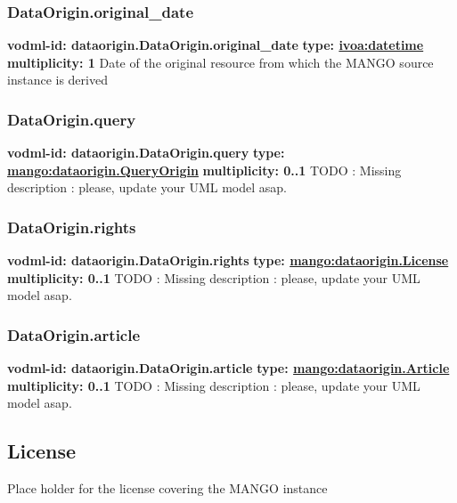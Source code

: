     \subsubsection{DataOrigin.original_date}
      \textbf{vodml-id: dataorigin.DataOrigin.original_date} \newline
      \textbf{type: \hyperref[sect:ivoa]{ivoa:datetime}} \newline
      \textbf{multiplicity: 1} \newline
      Date of the original resource from which the MANGO source instance is derived

    \subsubsection{DataOrigin.query}
      \textbf{vodml-id: dataorigin.DataOrigin.query} \newline
      \textbf{type: \hyperref[sect:dataorigin.QueryOrigin]{mango:dataorigin.QueryOrigin}} \newline
      \textbf{multiplicity: 0..1} \newline
      TODO : Missing description : please, update your UML model asap.

    \subsubsection{DataOrigin.rights}
      \textbf{vodml-id: dataorigin.DataOrigin.rights} \newline
      \textbf{type: \hyperref[sect:dataorigin.License]{mango:dataorigin.License}} \newline
      \textbf{multiplicity: 0..1} \newline
      TODO : Missing description : please, update your UML model asap.

    \subsubsection{DataOrigin.article}
      \textbf{vodml-id: dataorigin.DataOrigin.article} \newline
      \textbf{type: \hyperref[sect:dataorigin.Article]{mango:dataorigin.Article}} \newline
      \textbf{multiplicity: 0..1} \newline
      TODO : Missing description : please, update your UML model asap.

  \subsection{License}
  \label{sect:dataorigin.License}
    Place holder for the license covering the MANGO instance

